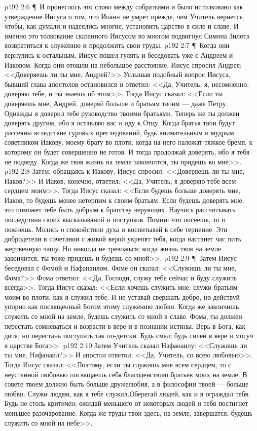 \vs p192 2:6 \P\ И пронеслось это слово между собратьями и было истолковано как утверждение Иисуса о том, что Иоанн не умрет прежде, чем Учитель вернется, чтобы, как думали и надеялись многие, установить царство в силе и славе. И именно это толкование сказанного Иисусом во многом подвигнул Симона Зилота возвратиться к служению и продолжить свои труды.
\vs p192 2:7 \P\ Когда они вернулись к остальным, Иисус пошел гулять и беседовать уже с Андреем и Иаковом. Когда они отошли на небольшое расстояние, Иисус спросил Андрея: <<Доверяешь ли ты мне, Андрей?>> Услышав подобный вопрос Иисуса, бывший глава апостолов остановился и ответил: <<Да, Учитель, я, несомненно, доверяю тебе, и ты знаешь об этом>>. Тогда Иисус сказал: <<Если ты доверяешь мне, Андрей, доверяй больше и братьям твоим --- даже Петру. Однажды я доверил тебе руководство твоими братьями. Теперь же ты должен доверять другим, ибо я оставляю вас и иду к Отцу. Когда братья твои будут рассеяны вследствие суровых преследований, будь внимательным и мудрым советником Иакову, моему брату во плоти, когда на него наложат тяжкое бремя, к которому он будет совершенно не готов. И тогда продолжай доверять, ибо я тебя не подведу. Когда же твоя жизнь на земле закончится, ты придешь ко мне>>.
\vs p192 2:8 Затем, обращаясь к Иакову, Иисус спросил: <<Доверяешь ли ты мне, Иаков?>> И Иаков, конечно, ответил: <<Да, Учитель, я доверяю тебе всем сердцем моим>>. Тогда Иисус сказал: <<Если будешь больше доверять мне, Иаков, то будешь менее нетерпим к своим братьям. Если будешь доверять мне, это поможет тебе быть добрым к братству верующих. Научись рассчитывать последствия своих высказываний и поступков. Помни: что посеешь, то и пожнешь. Молись о спокойствии духа и воспитывай в себе терпение. Эти добродетели в сочетании с живой верой укрепят тебя, когда настанет час пить жертвенную чашу. Но никогда не тревожься; когда жизнь твоя на земле закончится, ты тоже придешь и будешь со мной>>.
\vs p192 2:9 \P\ Затем Иисус беседовал с Фомой и Нафанаилом. Фоме он сказал: <<Служишь ли ты мне, Фома?>> Фома ответил: <<Да, Господи, служу тебе сейчас и буду служить всегда>>. Тогда Иисус сказал: <<Если хочешь служить мне, служи братьям моим во плоти, как я служил тебе. И не уставай свершать добро, но действуй упорно как посвященный Богом этому служению любви. Когда же закончишь служить со мной на земле, будешь служить со мной в славе. Фома, ты должен перестать сомневаться и возрасти в вере и в познании истины. Верь в Бога, как дитя, но перестань поступать так по\hyp{}детски. Будь смел; будь силен в вере и могуч в царстве Бога>>.
\vs p192 2:10 Затем Учитель сказал Нафанаилу: <<Служишь ли ты мне, Нафанаил?>> И апостол ответил: <<Да, Учитель, со всею любовью>>. Тогда Иисус сказал: <<Поэтому, если ты служишь мне всем сердцем, то с неустанной любовью посвящаешь себя благоденствию братьев моих на земле. В совете твоем должно быть больше дружелюбия, а в философии твоей --- больше любви. Служи людям, как я тебе служил.Оберегай людей, как и я ограждал тебя. Будь не столь критичен; ожидай меньшего от некоторых людей и тебя постигнет меньшее разочарование. Когда же труды твои здесь, на земле, завершатся, будешь служить со мной на небе>>.
